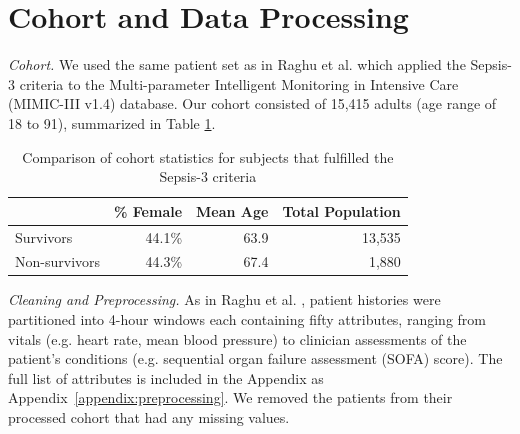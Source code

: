 \documentclass[10pt]{amia}
\begin{document}


\section*{Cohort and Data Processing}

\textit{Cohort.} We used the same patient set as in Raghu et al. \cite{DBLP:journals/corr/RaghuKCSG17} which applied the Sepsis-3 
criteria to the Multi-parameter Intelligent Monitoring in Intensive Care (MIMIC-III v1.4) database. \cite{johnson2016mimic} Our cohort consisted of 15,415 adults (age range of 18 to 91), summarized in Table \ref{table:demographics}. 

\begin{table}[h]
\centering
\caption{Comparison of cohort statistics for subjects that fulfilled the Sepsis-3 criteria}
\label{table:demographics}
\begin{tabular}{|l|r|r|r|}
\hline
 & \% Female & Mean Age & Total Population \\
 \hline
 Survivors & 44.1\% & 63.9 &13,535 \\
 \hline
 Non-survivors & 44.3\% & 67.4 & 1,880 \\
 \hline
\end{tabular}
\end{table}

\textit{Cleaning and Preprocessing.}
As in Raghu et al. \cite{DBLP:journals/corr/RaghuKCSG17}, patient histories were partitioned into 4-hour windows each containing fifty attributes, ranging from vitals (e.g. heart rate, mean blood pressure) to clinician assessments of the patient's conditions (e.g. sequential organ failure assessment (SOFA) score).  The full list of attributes is included in the Appendix as Appendix~\ref{appendix:preprocessing}. We removed the patients from their processed cohort that had any missing values. 
\end{document}

